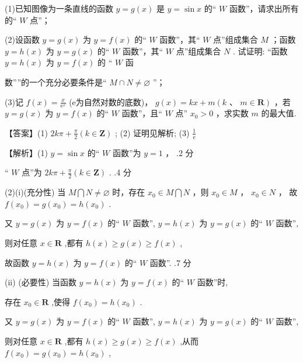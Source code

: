 \documentclass[10pt]{article}
\begin{document}
(1)已知图像为一条直线的函数 \(y = g\left( x\right)\) 是 \(y = \sin x\) 的“ \(W\) 函数”，请求出所有的“ \(W\) 点”；

(2)设函数 \(y = g\left( x\right)\) 为 \(y = f\left( x\right)\) 的“ \(W\) 函数”，其“ \(W\) 点”组成集合 \(M\) ；函数 \(y = h\left( x\right)\) 为 \(y = g\left( x\right)\) 的“ \(W\) 函数”，其“ \(W\) 点”组成集合 \(N\) . 试证明: “函数 \(y = h\left( x\right)\) 为 \(y = f\left( x\right)\) 的 “ \(W\) 函

数””的一个充分必要条件是“ \(M \cap  N \neq  \varnothing\) ”；

(3)记 \(f\left( x\right)  = \frac{x}{{\mathrm{e}}^{x}}\) (e为自然对数的底数)， \(g\left( x\right)  = {kx} + m\left( {k\text{ 、 }m \in  \mathbf{R}}\right)\) ，若 \(y = g\left( x\right)\) 为 \(y = f\left( x\right)\) 的“ \(W\) 函数”，且“ \(W\) 点” \({x}_{0} > 0\) ，求实数 \(m\) 的最大值.

【答案】(1) \({2k\pi } + \frac{\pi }{2}\left( {k \in  \mathbf{Z}}\right)\) ; (2) 证明见解析; (3) \(\frac{1}{\mathrm{e}}\)

【解析】(1) \(y = \sin x\) 的“ \(W\) 函数”为 \(y = 1\) ， .2 分

“ \(W\) 点”为 \({2k\pi } + \frac{\pi }{2}\left( {k \in  \mathbf{Z}}\right)\) . .4 分

(2)(i)(充分性) 当 \(M\bigcap N \neq  \varnothing\) 时，存在 \({x}_{0} \in  M\bigcap N\) ，则 \({x}_{0} \in  M\) ， \({x}_{0} \in  N\) ， 故 \(f\left( {x}_{0}\right)  = g\left( {x}_{0}\right)  = h\left( {x}_{0}\right)\) .

又 \(y = g\left( x\right)\) 为 \(y = f\left( x\right)\) 的“ \(W\) 函数”, \(y = h\left( x\right)\) 为 \(y = g\left( x\right)\) 的“ \(W\) 函数”,

则对任意 \(x \in  \mathbf{R}\) ,都有 \(h\left( x\right)  \geq  g\left( x\right)  \geq  f\left( x\right)\) ,

故函数 \(y = h\left( x\right)\) 为 \(y = f\left( x\right)\) 的“ \(W\) 函数”. .7 分

(ii) (必要性) 当函数 \(y = h\left( x\right)\) 为 \(y = f\left( x\right)\) 的“ \(W\) 函数”时,

存在 \({x}_{0} \in  \mathbf{R}\) ,使得 \(f\left( {x}_{0}\right)  = h\left( {x}_{0}\right)\) .

又 \(y = g\left( x\right)\) 为 \(y = f\left( x\right)\) 的“ \(W\) 函数”, \(y = h\left( x\right)\) 为 \(y = g\left( x\right)\) 的“ \(W\) 函数”,

则对任意 \(x \in  \mathbf{R}\) ,都有 \(h\left( x\right)  \geq  g\left( x\right)  \geq  f\left( x\right)\) ,从而 \(f\left( {x}_{0}\right)  = g\left( {x}_{0}\right)  = h\left( {x}_{0}\right)\) ,
\end{document}
